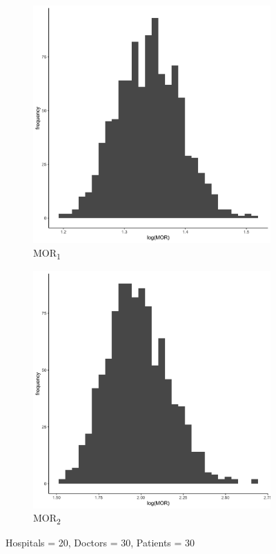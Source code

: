 \documentclass[
  letterpaper,
  DIV=11,
  numbers=noendperiod,
  titlepage]{scrartcl}
\begin{document}
\vspace{10mm}

\begin{figure}
\centering
\begin{subfigure}{.49\textwidth}
    \centering
    \includegraphics[width=.95\linewidth]{../../plots/three-lvl-ran-int/high-prev/hist_20_30_30_three_lvl_high_prev_mor1.png}  
    \caption{MOR\textsubscript{1}}
    \label{l20m30n301}
\end{subfigure}
\begin{subfigure}{.49\textwidth}
    \centering
    \includegraphics[width=.95\linewidth]{../../plots/three-lvl-ran-int/high-prev/hist_20_30_30_three_lvl_high_prev_mor2.png}
    \caption{MOR\textsubscript{2}}
    \label{l20m30n302}
\end{subfigure}
\caption{Hospitals = 20, Doctors = 30, Patients = 30}
\label{mor2}
\end{figure}
\end{document}
